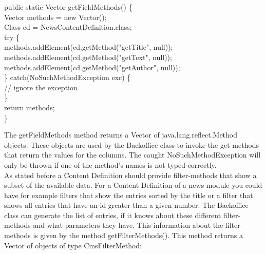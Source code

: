 \begin{java}
\jtaba public static Vector getFieldMethods() \{\\
\jtabb        Vector methods = new Vector();\\
\jtabb        Class cd = NewsContentDefinition.class;\\
\jtabb        try \{\\
\jtabc                methods.addElement(cd.getMethod("getTitle", null));\\
\jtabc                methods.addElement(cd.getMethod("getText", null));\\
\jtabc                methods.addElement(cd.getMethod("getAuthor", null));\\
\jtabb        \} catch(NoSuchMethodException exc) \{\\
\jtabc                // ignore the exception\\
\jtabb        \}\\
\jtabb        return methods;\\
\jtaba \}\\
\end{java}

The {\meth getFieldMethods} method returns a Vector of {\class java.lang.reflect.Method} objects.
These objects are used by the Backoffice class to invoke the get methods that return
the values for the columns. The caught {\class NoSuchMethodException} will only 
be thrown if one of the method's names is not typed correctly.\\

As stated before a Content Definition should provide filter-methods that show a 
subset of the available data. For a Content Definition of a news-module you could have for example 
filters that show the entries sorted by the title or a filter that shows
all entries that have an id greater than a given number. The Backoffice class can
generate the list of entries, if it knows about these different filter-methods and
what parameters they have. This information about the filter-methods is given by the
method {\meth getFilterMethods()}. This method returns a Vector of objects of type 
{\class CmsFilterMethod}:\\

